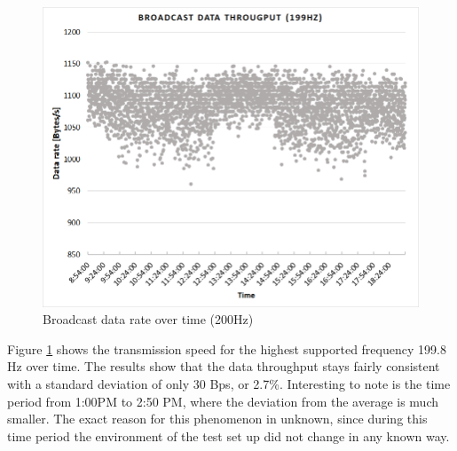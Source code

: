 \begin{description}
	\begin{figure}[H]
		\centering
		\includegraphics[scale=0.5]{content/images/exp1_long.png}
		\caption{Broadcast data rate over time (200Hz)}\label{fig:exp1long}
	\end{figure}
	Figure \ref{fig:exp1long} shows the transmission speed for the highest supported frequency 199.8 Hz over time. The results show that the data throughput stays fairly consistent with a standard deviation of only 30 Bps, or 2.7\%. Interesting to note is the time period from 1:00PM to 2:50 PM, where the deviation from the average is much smaller. The exact reason for this phenomenon in unknown, since during this time period the environment of the test set up did not change in any known way.
\end{description}
\newpage

